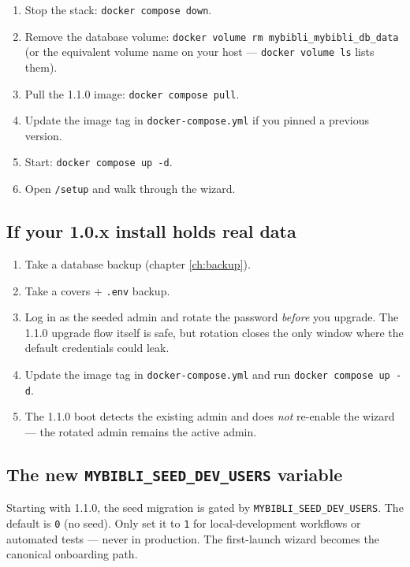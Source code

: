 \begin{enumerate}
  \item Stop the stack: \texttt{docker compose down}.
  \item Remove the database volume:
        \texttt{docker volume rm mybibli\_mybibli\_db\_data}
        (or the equivalent volume name on your host —
        \texttt{docker volume ls} lists them).
  \item Pull the 1.1.0 image:
        \texttt{docker compose pull}.
  \item Update the image tag in \texttt{docker-compose.yml} if you
        pinned a previous version.
  \item Start: \texttt{docker compose up -d}.
  \item Open \texttt{/setup} and walk through the wizard.
\end{enumerate}

\subsection*{If your 1.0.x install holds real data}

\begin{enumerate}
  \item Take a database backup (chapter \ref{ch:backup}).
  \item Take a covers + \texttt{.env} backup.
  \item Log in as the seeded admin and rotate the password
        \emph{before} you upgrade. The 1.1.0 upgrade flow itself is
        safe, but rotation closes the only window where the default
        credentials could leak.
  \item Update the image tag in \texttt{docker-compose.yml} and run
        \texttt{docker compose up -d}.
  \item The 1.1.0 boot detects the existing admin and does
        \emph{not} re-enable the wizard — the rotated admin remains
        the active admin.
\end{enumerate}

\subsection*{The new \texttt{MYBIBLI\_SEED\_DEV\_USERS} variable}

Starting with 1.1.0, the seed migration is gated by
\texttt{MYBIBLI\_SEED\_DEV\_USERS}.
The default is \texttt{0} (no seed). Only set it to \texttt{1} for
local-development workflows or automated tests — never in
production. The first-launch wizard becomes the canonical
onboarding path.

